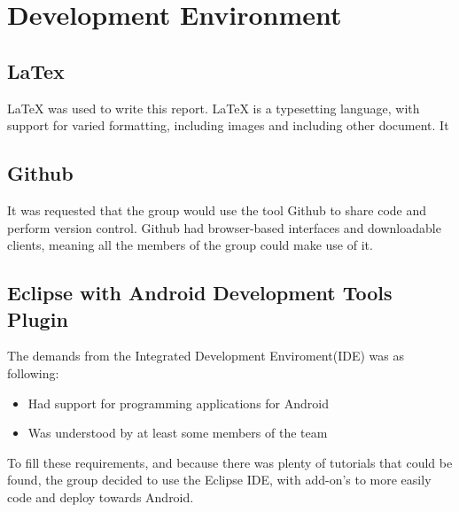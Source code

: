 \chapter{Development Environment}

\section{LaTex}
LaTeX was used to write this report. LaTeX is a typesetting language, with support for varied formatting, including images and including other document. It
\section{Github}
It was requested that the group would use the tool Github to share code and perform version control. Github had browser-based interfaces and downloadable clients, meaning all the members of the group could make use of it. 


\section{Eclipse with Android Development Tools Plugin}
The demands from the Integrated Development Enviroment(IDE) was as following:
\begin{itemize}
\item Had support for programming applications for Android
\item Was understood by at least some members of the team
\end{itemize}
To fill these requirements, and because there was plenty of tutorials that could be found, the group decided to use the Eclipse IDE, with add-on's to more easily code and deploy towards Android. 


 